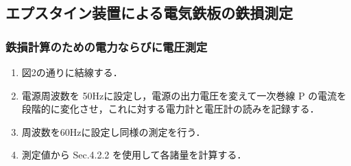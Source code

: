 \subsection{エプスタイン装置による電気鉄板の鉄損測定}
\subsubsection{鉄損計算のための電力ならびに電圧測定}
\begin{enumerate}
  \item 図2の通りに結線する．
  \item 電源周波数を 50Hzに設定し，電源の出力電圧を変えて一次巻線 P の電流を段階的に変化させ，これに対する電力計と電圧計の読みを記録する．
  \item 周波数を60Hzに設定し同様の測定を行う．
  \item 測定値から Sec.4.2.2 を使用して各諸量を計算する．
\end{enumerate}

